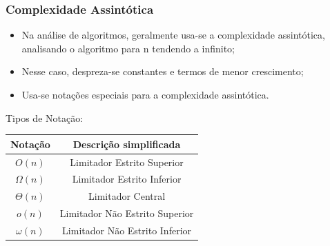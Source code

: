 \documentclass[10pt]{beamer}
\begin{document}
\begin{frame}[t]
    \frametitle{Complexidade Assintótica}
    \begin{itemize}
        \item Na análise de algoritmos, geralmente usa-se a complexidade assintótica, analisando o algoritmo para n tendendo a infinito;
        \item Nesse caso, despreza-se constantes e termos de menor crescimento;
        \item Usa-se notações especiais para a complexidade assintótica.
    \end{itemize}
    \pause Tipos de Notação:
    \pause\begin{center}

        \begin{tabular}{c|c}
            \textbf{Notação}   & \textbf{Descrição simplificada} \\
            \hline
            \pause $O(n)$      & Limitador Estrito Superior      \\
            \pause $\Omega(n)$ & Limitador Estrito Inferior      \\
            \pause $\Theta(n)$ & Limitador Central               \\
            \pause $o(n)$      & Limitador Não Estrito Superior  \\
            \pause $\omega(n)$ & Limitador Não Estrito Inferior  \\
            \hline
        \end{tabular}
    \end{center}
\end{frame}
\end{document}
